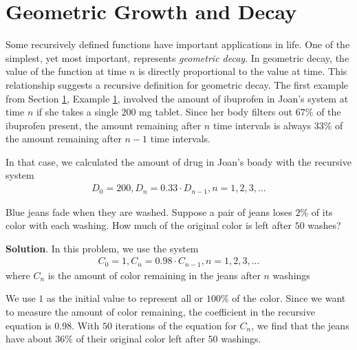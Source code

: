 \documentclass[10pt,]{book}
\theoremstyle{ptxdefinitionnotitle}
\theoremstyle{ptxdefinitiontitle}
\theoremstyle{ptxdefinitionnotitle}
\theoremstyle{ptxdefinitiontitle}
\theoremstyle{ptxdefinitionnotitle}
\theoremstyle{ptxdefinitiontitle}
\numberwithin{equation}{section}
\begin{document}
\section[{Geometric Growth and Decay}]{Geometric Growth and Decay}\label{chapter04-section03}
\hypertarget{p-67}{}%
Some recursively defined functions have important applications in life.  One of the simplest, yet most important, represents \emph{geometric decay}. In geometric decay, the value of the function at time \(n\) is directly proportional to the value at time. This relationship suggests a recursive definition for geometric decay. The first example from Section \hyperref[chapter04-section01]{1}, Example \hyperref[ibuprofen-example-one-dose]{1}, involved the amount of ibuprofen in Joan's system at time \(n\) if she takes a single \(200\) mg tablet. Since her body filters out \(67\%\) of the ibuprofen present, the amount remaining after \(n\) time intervals is always \(33\%\) of the amount remaining after \(n-1\) time intervals.%
\par
\hypertarget{p-68}{}%
In that case, we calculated the amount of drug in Joan's boady with the recursive system%
%
\begin{gather*}
D_0=200, D_n=0.33 \cdot D_{n-1}, n=1,2,3,...
\end{gather*}
\begin{example}\label{example-fading-blue-jeans}
\hypertarget{p-69}{}%
Blue jeans fade when they are washed. Suppose a pair of jeans loses \(2\%\) of its color with each washing.  How much of the original color is left after \(50\) washes?%
\par\smallskip%
\noindent\textbf{Solution}.\hypertarget{solution-4}{}\quad%
\hypertarget{p-70}{}%
In this problem, we use the system%
%
\begin{gather*}
C_0=1, C_n=0.98 \cdot C_{n-1}, n=1,2,3,...
\end{gather*}
\hypertarget{p-71}{}%
where \(C_n\) is the amount of color remaining in the jeans after \(n\) washings%
\par
\hypertarget{p-72}{}%
We use \(1\) as the initial value to represent all or \(100\%\) of the color.  Since we want to measure the amount of color remaining, the coefficient in the recursive equation is \(0.98\).  With \(50\) iterations of the equation for \(C_n\), we find that the jeans have about \(36\%\) of their original color left after \(50\) washings.%
\end{example}
\end{document}
